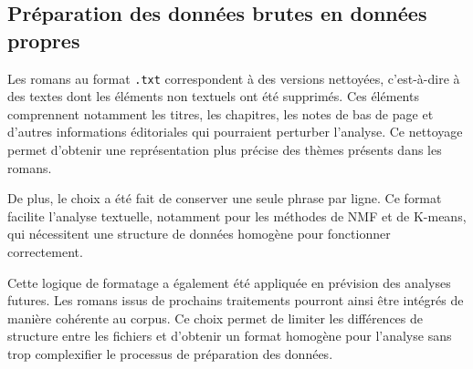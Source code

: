\documentclass{article}
\begin{document}
\subsection{Préparation des données brutes en données propres}

Les romans au format \texttt{.txt} correspondent à des versions nettoyées, c'est-à-dire à des textes dont les éléments non textuels ont été supprimés. Ces éléments comprennent notamment les titres, les chapitres, les notes de bas de page et d'autres informations éditoriales qui pourraient perturber l'analyse. Ce nettoyage permet d'obtenir une représentation plus précise des thèmes présents dans les romans.

De plus, le choix a été fait de conserver une seule phrase par ligne. Ce format facilite l'analyse textuelle, notamment pour les méthodes de NMF et de K-means, qui nécessitent une structure de données homogène pour fonctionner correctement.

Cette logique de formatage a également été appliquée en prévision des analyses futures. Les romans issus de prochains traitements pourront ainsi être intégrés de manière cohérente au corpus. Ce choix permet de limiter les différences de structure entre les fichiers et d'obtenir un format homogène pour l'analyse sans trop complexifier le processus de préparation des données.
\end{document}
